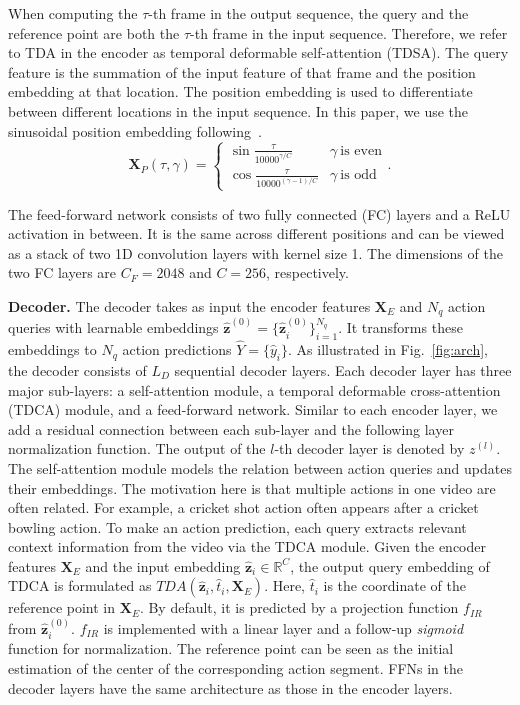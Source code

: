 \documentclass[lettersize,journal]{IEEEtran}
\def\R{\mathbb{R}}
\begin{document}
When computing the $\tau$-th frame in the output sequence, the query and the reference point are both the $\tau$-th frame in the input sequence. Therefore, we refer to TDA in the encoder as temporal deformable self-attention (TDSA). The query feature is the summation of the input feature of that frame and the position embedding at that location. The position embedding is used to differentiate between different locations in the input sequence.
In this paper, we use the sinusoidal position embedding following~\cite{vaswani2017attention}. 
\begin{equation}
    \boldsymbol{X}_P(\tau, \gamma) = \begin{cases} 
       \sin{\frac{\tau}{10000^{\gamma/C}}}& \gamma~\text{is even}\\
       \cos{\frac{\tau}{10000^{(\gamma-1)/C}}} & \gamma~\text{is odd}
    \end{cases}.
\end{equation}

The feed-forward network consists of two fully connected (FC) layers and a ReLU activation in between. It is the same across different positions and can be viewed as a stack of two 1D convolution layers with kernel size 1. The dimensions of the two FC layers are $C_F=2048$ and $C=256$, respectively. 

\vspace{1ex}\noindent\textbf{Decoder.}
The decoder takes as input the encoder features $\boldsymbol{X}_E $ and $N_q$ action queries with learnable embeddings $\hat{\boldsymbol{ z}}^{(0)}=\{\hat{\boldsymbol{ z}}_{i}^{(0)}\}_{i=1}^{N_q}$. It transforms these embeddings to $N_q$ action predictions $\hat{Y}=\{\hat{y}_i\}$. 
As illustrated in Fig.~\ref{fig:arch}, the decoder consists of $L_D$ sequential decoder layers. 
Each decoder layer has three major sub-layers: a self-attention module, a temporal deformable cross-attention (TDCA) module, and a feed-forward network. Similar to each encoder layer, we add a residual connection between each sub-layer and the following layer normalization function.  The output of the $l$-th decoder layer is denoted by $z^{(l)}$.
The self-attention module models the relation between action queries and updates their embeddings. The motivation here is that multiple actions in one video are often related. For example, a cricket shot action often appears after a cricket bowling action. To make an action prediction, each query extracts relevant context information from the video via the TDCA module. Given the encoder features $\boldsymbol{X}_E$ and the input embedding $\hat{\boldsymbol{z}}_{i} \in \R^{C}$, the output query embedding of TDCA is formulated as $TDA(\hat{\boldsymbol{z}}_{i}, \hat{t}_{i}, \boldsymbol{X}_E)$.  Here, $\hat{t}_{i}$ is the coordinate of the reference point in $\boldsymbol{X}_E$. By default, it is predicted by a projection function $f_{IR}$ from $\hat{\boldsymbol{ z}}_{i}^{(0)}$. $f_{IR}$ is implemented with a linear layer and a follow-up  \textit{sigmoid} function for normalization.
The reference point can be seen as the initial estimation of the center of the corresponding action segment. 
FFNs in the decoder layers have the same architecture as those in the encoder layers.
\end{document}
